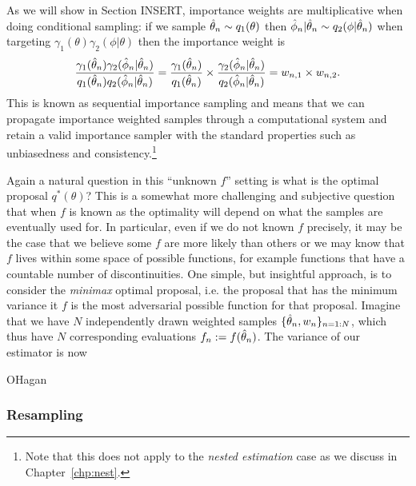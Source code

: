 As we will show in Section INSERT, importance weights are multiplicative when doing conditional
sampling: if we sample $\hat{\theta}_n \sim q_1(\theta)$ then $\hat{\phi}_n | \hat{\theta}_n \sim q_2(\phi | \hat{\theta}_n)$
when targeting $\gamma_1(\theta)\gamma_2(\phi|\theta)$ then the importance weight is 
\begin{align}
\label{eq:inf:prod-imp-weights}
\frac{\gamma_1(\hat{\theta}_n)\gamma_2(\hat{\phi}_n|\hat{\theta}_n)}{q_1(\hat{\theta}_n)q_2(\hat{\phi}_n | \hat{\theta}_n)}
=\frac{\gamma_1(\hat{\theta}_n)}{q_1(\hat{\theta}_n)}
\times\frac{\gamma_2(\hat{\phi}_n|\hat{\theta}_n)} {q_2(\hat{\phi}_n | \hat{\theta}_n)}= w_{n,1} \times w_{n,2}.
\end{align}
This is known as sequential importance sampling and means that we can propagate importance
weighted samples through a computational system and retain a valid importance
sampler with the standard properties such as unbiasedness and consistency.\footnote{Note that
	this does not apply to the \emph{nested estimation} case as we discuss in
	Chapter~\ref{chp:nest}.} 

Again a natural question in this ``unknown $f$'' setting is what is the optimal proposal $q^*(\theta)$?
This is a somewhat more challenging and subjective question that when $f$ is known as the
optimality will depend on what the samples are eventually used for.  In particular, even if we do
not known $f$ precisely, it may be the case that we believe some $f$ are more likely than others or we
may know that $f$ lives within some space of possible functions, for example functions that have
a countable number of discontinuities.  One simple, but insightful approach, is to consider the 
\emph{minimax} optimal proposal, i.e. the proposal that has the minimum variance it $f$ is the
most adversarial possible function for that proposal.  Imagine that we have $N$ independently drawn weighted samples
$\{\hat{\theta}_n,w_n\}_{n=1:N}$, which thus have $N$ corresponding evaluations $f_n := f(\hat{\theta}_n)$.
The variance of our estimator is now

OHagan



\subsubsection{Resampling}
\label{eq:inf:foundation:resampling}

